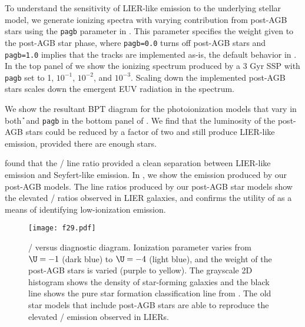 To understand the sensitivity of LIER-like emission to the underlying stellar model, we generate ionizing spectra with varying contribution from post-AGB stars using the {\tt pagb} parameter in \FSPS. This parameter specifies the weight given to the post-AGB star phase, where {\tt pagb=0.0} turns off post-AGB stars and {\tt pagb=1.0} implies that the \citet{Vassiliadis} tracks are implemented as-is, the default behavior in \FSPS. In the top panel of  we show the ionizing spectrum produced by a 3 Gyr SSP with {\tt pagb} set to 1, $10^{-1}$, $10^{-2}$, and $10^{-3}$. Scaling down the implemented post-AGB stars scales down the emergent EUV radiation in the spectrum.

We show the resultant BPT diagram for the photoionization models that vary in both \U{} and {\tt pagb} in the bottom panel of . We find that the luminosity of the post-AGB stars could be reduced by a factor of two and still produce LIER-like emission, provided there are enough stars.

\citet{Belfiore16} found that the \sii{}/\ha{} line ratio provided a clean separation between LIER-like emission and Seyfert-like emission. In , we show the \sii{} emission produced by our post-AGB models. The line ratios produced by our post-AGB star models show the elevated \sii{}/\ha{} ratios observed in LIER galaxies, and confirms the utility of \sii{} as a means of identifying low-ionization emission.

\begin{figure}[!htbp]
  \begin{centering}
    \texttt{[image: f29.pdf]}
    \caption{\sii{}/\ha{} versus \oiiihb{} diagnostic diagram. Ionization parameter varies from $\U=-1$ (dark blue) to $\U=-4$ (light blue), and the weight of the post-AGB stars is varied (purple to yellow). The grayscale 2D histogram shows the density of star-forming galaxies and the black line shows the pure star formation classification line from \citet{Kauffmann03a}. The old star models that include post-AGB stars are able to reproduce the elevated \sii{}/\ha{} emission observed in LIERs.}
    \label{fig:lier}
  \end{centering}
\end{figure}

